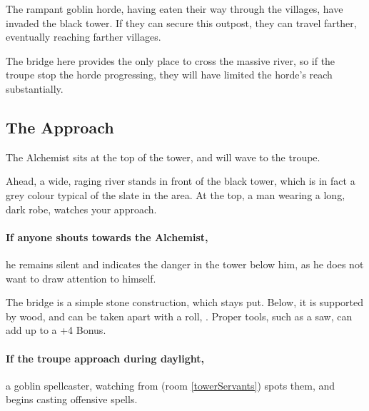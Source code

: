 \begin{multicols}{2}


\noindent
\begin{exampletext}
  The rampant goblin horde, having eaten their way through the villages, have invaded the black tower.
  If they can secure this outpost, they can travel farther, eventually reaching farther villages.

  The bridge here provides the only place to cross the massive river, so if the troupe stop the horde progressing, they will have limited the horde's reach substantially.
\end{exampletext}

\subsection{The Approach}

The Alchemist sits at the top of the tower, and will wave to the troupe.

\begin{boxtext}

  Ahead, a wide, raging river stands in front of the black tower, which is in fact a grey colour typical of the slate in the area.
  At the top, a man wearing a long, dark robe, watches your approach.

\end{boxtext}

\paragraph{If anyone shouts towards the Alchemist,}
he remains silent and indicates the danger in the tower below him, as he does not want to draw attention to himself.


The bridge is a simple stone construction, which stays put.
Below, it is supported by wood, and can be taken apart with a  roll, \tn[14].
Proper tools, such as a saw, can add up to a +4 Bonus.

\paragraph{If the troupe approach during daylight,}
a goblin spellcaster, watching from  (room \ref{towerServants}) spots them, and begins casting offensive spells.


\end{multicols}
